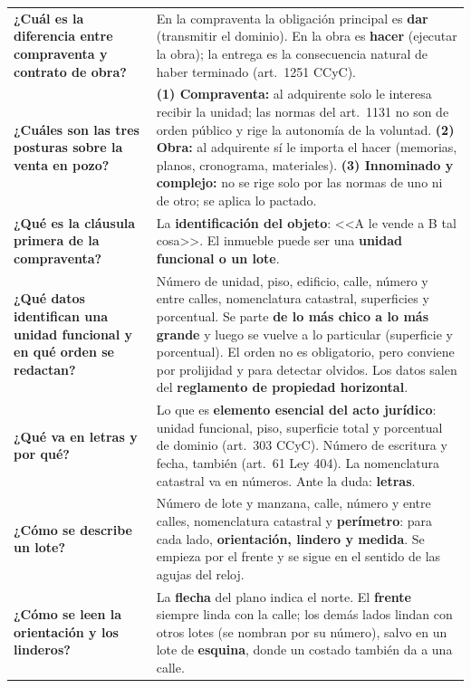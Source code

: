 \documentclass[12pt,oneside]{book}
\begin{document}
{\begin{longtable}{>{\RaggedRight\arraybackslash}p{4.2cm} >{\RaggedRight\arraybackslash}p{10.3cm}}
\addlinespace
\cmidrule{1-2}
\textbf{¿Cuál es la diferencia entre compraventa y contrato de obra?} &
En la compraventa la obligación principal es \textbf{dar} (transmitir el dominio). En la obra es \textbf{hacer} (ejecutar la obra); la entrega es la consecuencia natural de haber terminado (art.~1251 CCyC). \\
\addlinespace
\cmidrule{1-2}
\textbf{¿Cuáles son las tres posturas sobre la venta en pozo?} &
\textbf{(1) Compraventa:} al adquirente solo le interesa recibir la unidad; las normas del art.~1131 no son de orden público y rige la autonomía de la voluntad. \textbf{(2) Obra:} al adquirente sí le importa el hacer (memorias, planos, cronograma, materiales). \textbf{(3) Innominado y complejo:} no se rige solo por las normas de uno ni de otro; se aplica lo pactado. \\
\addlinespace
\cmidrule{1-2}
\textbf{¿Qué es la cláusula primera de la compraventa?} &
La \textbf{identificación del objeto}: <<A le vende a B tal cosa>>. El inmueble puede ser una \textbf{unidad funcional o un lote}. \\
\addlinespace
\cmidrule{1-2}
\textbf{¿Qué datos identifican una unidad funcional y en qué orden se redactan?} &
Número de unidad, piso, edificio, calle, número y entre calles, nomenclatura catastral, superficies y porcentual. Se parte \textbf{de lo más chico a lo más grande} y luego se vuelve a lo particular (superficie y porcentual). El orden no es obligatorio, pero conviene por prolijidad y para detectar olvidos. Los datos salen del \textbf{reglamento de propiedad horizontal}. \\
\addlinespace
\cmidrule{1-2}
\textbf{¿Qué va en letras y por qué?} &
Lo que es \textbf{elemento esencial del acto jurídico}: unidad funcional, piso, superficie total y porcentual de dominio (art.~303 CCyC). Número de escritura y fecha, también (art.~61 Ley 404). La nomenclatura catastral va en números. Ante la duda: \textbf{letras}. \\
\addlinespace
\cmidrule{1-2}
\textbf{¿Cómo se describe un lote?} &
Número de lote y manzana, calle, número y entre calles, nomenclatura catastral y \textbf{perímetro}: para cada lado, \textbf{orientación, lindero y medida}. Se empieza por el frente y se sigue en el sentido de las agujas del reloj. \\
\addlinespace
\cmidrule{1-2}
\textbf{¿Cómo se leen la orientación y los linderos?} &
La \textbf{flecha} del plano indica el norte. El \textbf{frente} siempre linda con la calle; los demás lados lindan con otros lotes (se nombran por su número), salvo en un lote de \textbf{esquina}, donde un costado también da a una calle. \\

\end{longtable}}
\end{document}
